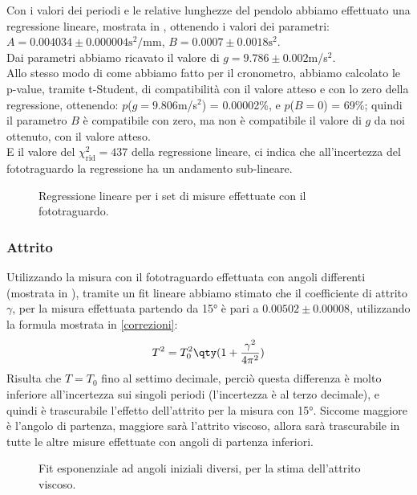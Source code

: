 Con i valori dei periodi e le relative lunghezze del pendolo abbiamo effettuato una regressione lineare, mostrata in , ottenendo i valori dei parametri: $A=0.004034 \pm 0.000004\text{s}^2/\text{mm}$, $B=0.0007 \pm0.0018\text{s}^2$.\\
Dai parametri abbiamo ricavato il valore di $g=9.786 \pm0.002$m/s$^2$.\\

Allo stesso modo di come abbiamo fatto per il cronometro, abbiamo calcolato le p-value, tramite t-Student, di compatibilità con il valore atteso e con lo zero della regressione, ottenendo: $p$(\(g = 9.806\)m/s$^2$) = 0.00002\%, e $p$($B = 0$) = 69\%; quindi il parametro $B$ è compatibile con zero, ma non è compatibile il valore di $g$ da noi ottenuto, con il valore atteso.\\
E il valore del $\chi^2_\text{rid} = 437$ della regressione lineare, ci indica che all'incertezza del fototraguardo la regressione ha un andamento sub-lineare.\\

\begin{figure}[h]
    \centering
    
    \caption{Regressione lineare per i set di misure effettuate con il fototraguardo.}
    \label{fig:reg lin fototraguardo}
\end{figure}

\subsubsection*{Attrito}
Utilizzando la misura con il fototraguardo effettuata con angoli differenti (mostrata in ), tramite un fit lineare abbiamo stimato che il coefficiente di attrito $\gamma$, per la misura effettuata partendo da 15° è pari a $0.00502 \pm0.00008$, utilizzando la formula mostrata in \ref{correzioni}: $$T^2 = T_0^2\qty(1 + \frac{\gamma^2}{4\pi^2})$$
Risulta che $T = T_0$ fino al settimo decimale, perciò questa differenza è molto inferiore all'incertezza sui singoli periodi (l'incertezza è al terzo decimale), e quindi è trascurabile l'effetto dell'attrito per la misura con 15°. Siccome maggiore è l'angolo di partenza, maggiore sarà l'attrito viscoso, allora sarà trascurabile in tutte le altre misure effettuate con angoli di partenza inferiori.\\

\begin{figure}[h]
    \centering
    
    \caption{Fit esponenziale ad angoli iniziali diversi, per la stima dell'attrito viscoso.}
    \label{fig:fit angoli diversi}
\end{figure}

